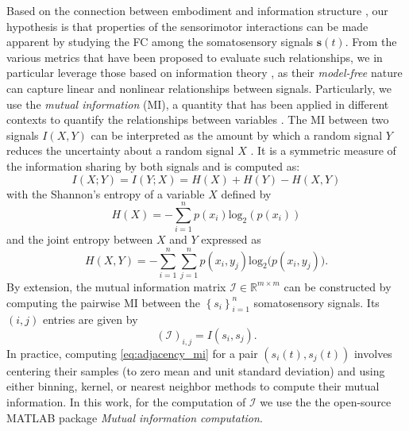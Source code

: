 Based on the connection between embodiment and information structure \cite{Pfeifer2007Selforganizationembodiment}, our hypothesis is that properties of the sensorimotor interactions can be made apparent by studying the FC among the somatosensory signals $ \bm{s}(t) $. From the various metrics that have been proposed to evaluate such relationships, we in particular leverage those based on information theory \cite{Bonsignorio2020EntropyBasedMetrics,Bonsignorio2013Quantifyingevolutionaryself}, as their \emph{model-free} nature can capture linear and nonlinear relationships between signals. Particularly, we use the \emph{mutual information} (MI), a quantity that has been applied in different contexts to quantify the relationships between variables \cite{Steuer2002mutualinformationdetecting}. The MI between two signals $ I\left(X,Y\right) $ can be interpreted as the amount by which a random signal $ Y $ reduces the uncertainty about a random signal $ X $ \cite{Cover1999Elementsinformationtheory}. It is a symmetric measure of the information sharing by both signals and is computed as:
\begin{equation}\label{eq:mutual_information}
	I\left(X;Y\right) =I\left(Y;X\right) = H(X) + H(Y) - H(X,Y)
\end{equation}
with the Shannon's entropy of a variable $X$ defined by 
\begin{equation}\label{eq:entropy}
	H(X) = -\sum_{i=1}^{n}p(x_i)\text{log}_2\left(p\left(x_i\right)\right)
\end{equation}
and the joint entropy between $ X $ and $ Y $ expressed as
\begin{equation}\label{eq:joint_entropy}
	H(X,Y) = -\sum_{i=1}^{n}\sum_{j=1}^{n} p(x_i,y_j)\text{log}_2\big(p\left(x_i,y_j\right)\big).
\end{equation}
By extension, the mutual information matrix $\bm{\mathcal{I}} \in \mathbb{R}^{m \times m}$ can be constructed by computing the pairwise MI between the $\left\lbrace s_i\right\rbrace^n_{i=1}$ somatosensory signals. Its $(i,j)$ entries are given by
\begin{equation}\label{eq:adjacency_mi}
	(\bm{\mathcal{I}})_{i,j} = I(s_i,s_j).
\end{equation}
In practice, computing \eqref{eq:adjacency_mi}  for a pair $\left({s}_i(t),{s}_j(t)\right)$ involves centering their samples (to zero mean and unit standard deviation) and using either binning, kernel, or nearest neighbor methods \cite{WaltersWilliams2009Estimationmutualinformation} to compute their mutual information. In this work, for the computation of $\bm{\mathcal{I}}$ we use the the open-source MATLAB package \emph{Mutual information computation}\cite{PengMutualInformationcomputation}.

